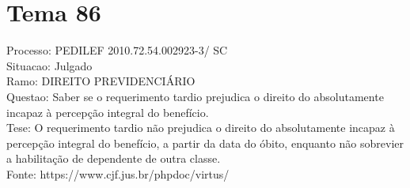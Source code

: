 \documentclass[12pt]{article}
\begin{document}
\section*{Tema 86}
Processo: PEDILEF 2010.72.54.002923-3/ SC\\
Situacao: Julgado\\
Ramo: DIREITO PREVIDENCIÁRIO\\
Questao: Saber se o requerimento tardio prejudica o direito do absolutamente incapaz à percepção integral do benefício.\\
Tese: O requerimento tardio não prejudica o direito do absolutamente incapaz à percepção integral do benefício, a partir da data do óbito, enquanto não sobrevier a habilitação de dependente de outra classe.\\
Fonte: https://www.cjf.jus.br/phpdoc/virtus/
\end{document}
